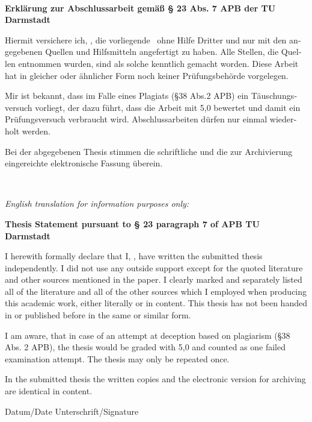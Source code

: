 \documentclass[thesis.tex]{subfiles}
\begin{document}
\begin{large}
\begin{otherlanguage}{ngerman}
\begin{center}
~

\textbf{Erklärung zur Abschlussarbeit gemäß § 23 Abs. 7 APB der TU Darmstadt}
\end{center}

Hiermit versichere ich, \statementAuthor, die vorliegende \thesisKind~ohne Hilfe Dritter und nur mit den angegebenen Quellen und Hilfsmitteln angefertigt zu haben. Alle Stellen, die Quellen entnommen wurden, sind als solche kenntlich gemacht worden. Diese Arbeit hat in gleicher oder ähnlicher Form noch keiner Prüfungsbehörde vorgelegen. 

Mir ist bekannt, dass im Falle eines Plagiats (§38 Abs.2 APB) ein Täuschungsversuch vorliegt, der dazu führt, dass die Arbeit mit 5,0 bewertet und damit ein Prüfungsversuch verbraucht wird. Abschlussarbeiten dürfen nur einmal wiederholt werden.

Bei der abgegebenen Thesis stimmen die schriftliche und die zur Archivierung eingereichte elektronische Fassung überein.
\end{otherlanguage}

~\hrulefill~


\begin{center}
\textit{English translation for information purposes only:}

\textbf{Thesis Statement pursuant to § 23 paragraph 7 of APB TU Darmstadt}
\end{center}

I herewith formally declare that I, \statementAuthor, have written the submitted thesis independently. I did not use any outside support except for the quoted literature and other sources mentioned in the paper. I clearly marked and separately listed all of the literature and all of the other sources which I employed when producing this academic work, either literally or in content. This thesis has not been handed in or published before in the same or similar form.

I am aware, that in case of an attempt at deception based on plagiarism (§38 Abs. 2 APB), the thesis would be graded with 5,0 and counted as one failed examination attempt. The thesis may only be repeated once.

In the submitted thesis the written copies and the electronic version for archiving are identical in content.


\vspace*{3cm}
{\small{Datum/Date \hspace*{3cm} Unterschrift/Signature}}

\end{large}
\end{document}
